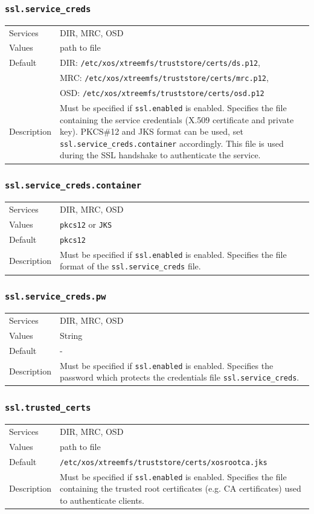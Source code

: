 \documentclass[a4paper,10pt]{book}
\begin{document}
\subsubsection{\texttt{ssl.service\_creds}}
\begin{tabular}{lp{10cm}}
 Services & DIR, MRC, OSD\\
 Values   & path to file\\
 Default  & DIR: \texttt{/etc/xos/xtreemfs/truststore/certs/ds.p12}, \\
 & MRC: \texttt{/etc/xos/xtreemfs/truststore/certs/mrc.p12}, \\
 & OSD: \texttt{/etc/xos/xtreemfs/truststore/certs/osd.p12}\\
 Description & Must be specified if \texttt{ssl.enabled} is enabled. Specifies the file containing the service credentials (X.509 certificate and private key). PKCS\#12 and JKS format can be used, set \texttt{ssl.service\_creds.container} accordingly. This file is used during the SSL handshake to authenticate the service.
\end{tabular}

\subsubsection{\texttt{ssl.service\_creds.container}}
\begin{tabular}{lp{10cm}}
 Services & DIR, MRC, OSD\\
 Values   & \texttt{pkcs12} or \texttt{JKS}\\
 Default  & \texttt{pkcs12}\\
 Description & Must be specified if \texttt{ssl.enabled} is enabled. Specifies the file format of the \texttt{ssl.service\_creds} file.
\end{tabular}

\subsubsection{\texttt{ssl.service\_creds.pw}}
\begin{tabular}{lp{10cm}}
 Services & DIR, MRC, OSD\\
 Values   & String\\
 Default  & -\\
 Description & Must be specified if \texttt{ssl.enabled} is enabled. Specifies the password which protects the credentials file \texttt{ssl.service\_creds}.
\end{tabular}

\subsubsection{\texttt{ssl.trusted\_certs}}
\begin{tabular}{lp{10cm}}
 Services & DIR, MRC, OSD\\
 Values   & path to file\\
 Default  & \texttt{/etc/xos/xtreemfs/truststore/certs/xosrootca.jks}\\
 Description & Must be specified if \texttt{ssl.enabled} is enabled. Specifies the file containing the trusted root certificates (e.g. CA certificates) used to authenticate clients.
\end{tabular}
\end{document}
